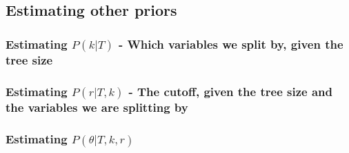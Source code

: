 
\subsection{Estimating other priors}

\subsubsection{Estimating \(P(k|T)\) - Which variables we split by, given the tree size}

\subsubsection{Estimating \(P(r|T, k)\) - The cutoff, given the tree size and the variables we are splitting by}

\subsubsection{Estimating \(P(\theta | T, k, r)\)}


